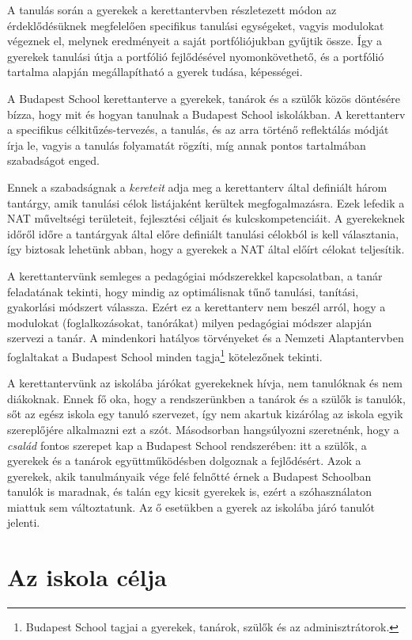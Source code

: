 A tanulás során a gyerekek a kerettantervben részletezett módon az érdeklődésüknek megfelelően specifikus tanulási egységeket, vagyis modulokat végeznek el, melynek eredményeit a saját portfóliójukban gyűjtik össze. Így a gyerekek tanulási útja a portfólió fejlődésével nyomonkövethető, és a portfólió tartalma alapján megállapítható a gyerek tudása, képességei.

A Budapest School kerettanterve a gyerekek, tanárok és a szülők közös döntésére bízza, hogy mit és hogyan tanulnak a Budapest School iskolákban. A kerettanterv a specifikus célkitűzés-tervezés, a tanulás, és az arra történő reflektálás módját írja le, vagyis a tanulás folyamatát rögzíti, míg annak pontos tartalmában szabadságot enged.

Ennek a szabadságnak a \emph{kereteit} adja meg a kerettanterv által definiált három tantárgy, amik tanulási célok listájaként kerültek megfogalmazásra. Ezek lefedik a NAT műveltségi területeit, fejlesztési céljait és kulcskompetenciáit. A gyerekeknek időről időre a tantárgyak által előre definiált tanulási célokból is kell választania, így biztosak lehetünk abban, hogy a gyerekek a NAT által előírt célokat teljesítik. 

A kerettantervünk semleges a pedagógiai módszerekkel kapcsolatban, a tanár feladatának tekinti, hogy mindig az optimálisnak tűnő tanulási, tanítási, gyakorlási módszert válassza. Ezért ez a kerettanterv nem beszél arról, hogy a modulokat (foglalkozásokat, tanórákat) milyen pedagógiai módszer alapján szervezi a tanár. A mindenkori hatályos törvényeket és a Nemzeti Alaptantervben foglaltakat a Budapest School minden tagja\footnote{Budapest School tagjai a gyerekek, tanárok, szülők és az adminisztrátorok.} kötelezőnek tekinti.

A kerettantervünk az iskolába járókat gyerekeknek hívja, nem tanulóknak és nem diákoknak. Ennek fő oka, hogy a rendszerünkben a tanárok és a szülők is tanulók, sőt az egész iskola egy tanuló szervezet, így nem akartuk  kizárólag az iskola egyik szereplőjére alkalmazni ezt a szót. Másodsorban hangsúlyozni szeretnénk, hogy a \emph{család} fontos szerepet kap a Budapest School rendszerében: itt a szülők, a gyerekek és a tanárok együttműködésben dolgoznak a fejlődésért. Azok a gyerekek, akik tanulmányaik vége felé felnőtté érnek a Budapest Schoolban tanulók is maradnak, és talán egy kicsit gyerekek is, ezért a szóhasználaton miattuk sem változtatunk. Az ő esetükben a gyerek az iskolába járó tanulót jelenti.

\section{Az iskola célja}

